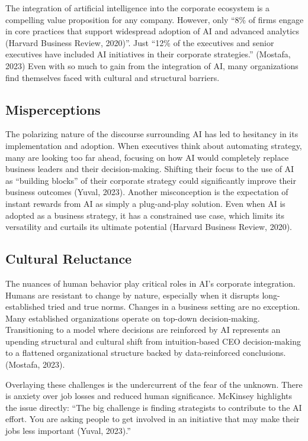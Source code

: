 \documentclass[
]{book}
\begin{document}
The integration of artificial intelligence into the corporate ecosystem is a compelling value proposition for any company. However, only ``8\% of firms engage in core practices that support widespread adoption of AI and advanced analytics (Harvard Business Review, 2020)''. Just ``12\% of the executives and senior executives have included AI initiatives in their corporate strategies.'' (Mostafa, 2023) Even with so much to gain from the integration of AI, many organizations find themselves faced with cultural and structural barriers.

\hypertarget{misperceptions}{%
\subsection{Misperceptions}\label{misperceptions}}

The polarizing nature of the discourse surrounding AI has led to hesitancy in its implementation and adoption. When executives think about automating strategy, many are looking too far ahead, focusing on how AI would completely replace business leaders and their decision-making. Shifting their focus to the use of AI as ``building blocks'' of their corporate strategy could significantly improve their business outcomes (Yuval, 2023). Another misconception is the expectation of instant rewards from AI as simply a plug-and-play solution. Even when AI is adopted as a business strategy, it has a constrained use case, which limits its versatility and curtails its ultimate potential (Harvard Business Review, 2020).

\hypertarget{cultural-reluctance}{%
\subsection{Cultural Reluctance}\label{cultural-reluctance}}

The nuances of human behavior play critical roles in AI's corporate integration. Humans are resistant to change by nature, especially when it disrupts long-established tried and true norms. Changes in a business setting are no exception. Many established organizations operate on top-down decision-making. Transitioning to a model where decisions are reinforced by AI represents an upending structural and cultural shift from intuition-based CEO decision-making to a flattened organizational structure backed by data-reinforced conclusions. (Mostafa, 2023).

Overlaying these challenges is the undercurrent of the fear of the unknown. There is anxiety over job losses and reduced human significance. McKinsey highlights the issue directly: ``The big challenge is finding strategists to contribute to the AI effort. You are asking people to get involved in an initiative that may make their jobs less important (Yuval, 2023).''
\end{document}

